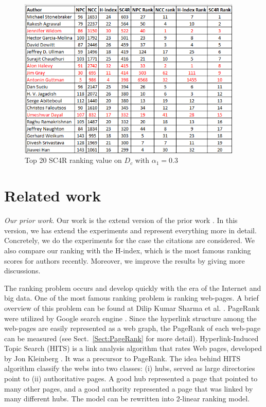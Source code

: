 \documentclass[10pt,leqno,twoside]{article}
\begin{document}
\begin{figure} %
	\caption{Top 20 SC4R ranking value on $D_c$ with $\alpha_1=0.3$}
	\label{Fig:Top20AuthorDetail}
    \centering
    \includegraphics[width=0.95\textwidth]{DCt20SC4Ra-f}
\end{figure}
%
\section{Related work}\label{Sect:Related}
\textit{Our prior work}. Our work is the extend version of the prior work \cite{Vu14}. In this version, we has extend the experiments and represent everything more in detail. Concretely, we do the experiments for the case the citations are considered. We also compare our ranking with the H-index, which is the most famous ranking scores for authors recently. Moreover, we improve the results by giving more discussions.

The ranking problem occurs and develop quickly with the era of the Internet and big data. One of the most famous ranking problem is ranking web-pages. A brief overview of this problem can be found at Dilip Kumar Sharma et al. \cite{RankOverview}. PageRank were utilized by Google search engine \cite{pagerank98}.
Since the hyperlink structure among the web-pages are easily represented as a web graph,
the PageRank of each web-page can be measured (see Sect.~\ref{Sect:PageRank} for more detail). Hyperlink-Induced Topic Search (HITS) is a link analysis algorithm that rates Web pages, developed by Jon Kleinberg \cite{HIndex}. It was a precursor to PageRank. The idea behind HITS algorithm classify the webs into two classes: (i) hubs, served as large directories point to (ii) authoritative pages. A good hub represented a page that pointed to many other pages, and a good authority represented a page that was linked by many different hubs. The model can be rewritten into 2-linear ranking model.
\end{document}
